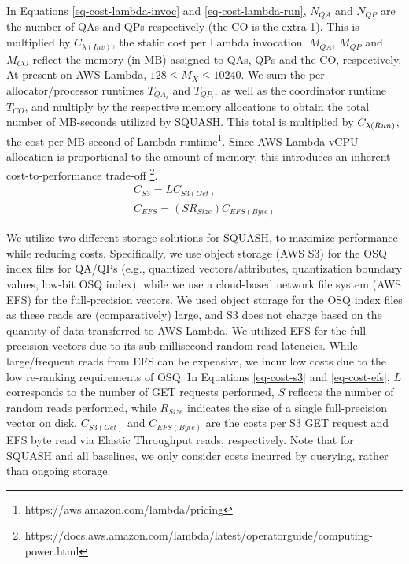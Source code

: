 In Equations \ref{eq-cost-lambda-invoc} and \ref{eq-cost-lambda-run}, $N_{QA}$ and $N_{QP}$ are the number of QAs and QPs respectively (the CO is the extra 1). 
This is multiplied by $C_{\lambda(Inv)}$, the static cost per Lambda invocation. 
$M_{QA}$, $M_{QP}$ and $M_{CO}$ reflect the memory (in MB) assigned to QAs, QPs and the CO, respectively. 
At present on AWS Lambda, $128 \leq M_X \leq 10240$. 
We sum the per-allocator/processor runtimes $T_{QA_{i}}$ and $T_{QP_{i}}$, as well as the coordinator runtime $T_{CO}$, and multiply by the respective memory allocations to obtain the total number of MB-seconds utilized by SQUASH. This total is multiplied by $C_{\lambda\text(Run)}$, the cost per MB-second of Lambda runtime\footnote{https://aws.amazon.com/lambda/pricing}. %
Since AWS Lambda vCPU allocation is proportional to the amount of memory, this introduces an inherent cost-to-performance trade-off \footnote{https://docs.aws.amazon.com/lambda/latest/operatorguide/computing-power.html}. %
\begin{gather}
    C_{S3} = LC_{S3(Get)}\label{eq-cost-s3}\\
    C_{EFS} = (SR_{Size})C_{EFS(Byte)}\label{eq-cost-efs}
\end{gather}


We utilize two different storage solutions for SQUASH, to maximize performance while reducing costs. 
Specifically, we use object storage (AWS S3) for the OSQ index files for QA/QPs (e.g., quantized vectors/attributes, quantization boundary values, low-bit OSQ index), while we use a cloud-based network file system (AWS EFS) for the full-precision vectors.
We used object storage for the OSQ index files as these reads are (comparatively) large, and S3 does not charge based on the quantity of data transferred to AWS Lambda.
We utilized EFS for the full-precision vectors due to its sub-millisecond random read latencies. While large/frequent reads from EFS can be expensive, we incur low costs due to the low re-ranking requirements of OSQ.
In Equations \ref{eq-cost-s3} and \ref{eq-cost-efs}, $L$ corresponds to the number of GET requests performed, $S$ reflects the number of random reads performed, while $R_{Size}$ indicates the size of a single full-precision vector on disk. $C_{S3(Get)}$ and $C_{EFS(Byte)}$ are the costs per S3 GET request and EFS byte read via Elastic Throughput reads, respectively. Note that for SQUASH and all baselines, we only consider costs incurred by querying, rather than ongoing storage.